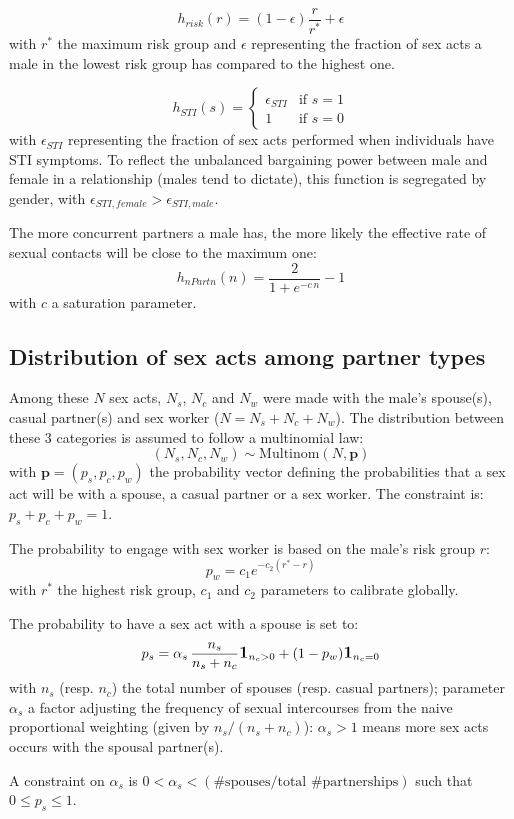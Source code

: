 \documentclass[11pt, onecolumn]{article}
\newcommand{\one}[1]{\textbf{\large{1}}_{#1}}
\begin{document}
$$h_{risk}(r) = (1-\epsilon)\frac{r}{r^*} + \epsilon $$
with $r^*$ the maximum risk group and $\epsilon$ representing the fraction of sex acts a male in the lowest risk group has compared to the highest one.

$$h_{STI}(s) = 
\begin{cases}
\epsilon_{STI} & \text{if } s=1\\
1 & \text{if } s=0
\end{cases}$$
with $\epsilon_{STI}$ representing the fraction of sex acts performed when individuals have STI symptoms. 
To reflect the unbalanced bargaining power between male and female in a relationship (males tend to dictate), this function is segregated by gender, with $\epsilon_{STI,female}>\epsilon_{STI,male}$. 

The more concurrent partners a male has, the more likely the effective rate of sexual contacts will be close to the maximum one:
$$h_{nPartn}(n) = \frac{2}{1+e^{-c\, n}} -1 $$
with $c$ a saturation parameter.

\subsection{Distribution of sex acts among partner types}

Among these $N$ sex acts, $N_s$, $N_c$ and $N_w$ were made with the male's spouse(s), casual partner(s) and sex worker ($N=N_s+N_c+N_w$). The distribution between these 3 categories is assumed to follow a multinomial law: 
$$(N_s,N_c,N_w) \sim \mathrm{Multinom}(N,\mathbf{p}) $$
with $\mathbf{p}=(p_s,p_c,p_w)$ the probability vector defining the probabilities that a sex act will be with a spouse, a casual partner or a sex worker. The constraint is: $p_s+p_c+p_w=1$.

The probability to engage with sex worker is based on the male's risk group $r$:
$$ p_w = c_1 e^{-c_2(r^*-r)}$$
with $r^*$ the highest risk group, $c_1$ and $c_2$ parameters to calibrate globally. 

The probability to have a sex act with a spouse is set to:
$$p_s = \alpha_s \,\frac{n_s}{n_s+n_c} \one{n_c>0} + (1-p_w)\one{n_c=0}$$
with $n_s$ (resp. $n_c$) the total number of spouses (resp. casual partners); parameter $\alpha_s$ a factor adjusting the frequency of sexual intercourses from the naive proportional weighting (given by $n_s/(n_s+n_c)$): $\alpha_s>1$ means more sex acts occurs with the spousal partner(s). 


A constraint on $\alpha_s$ is $0<\alpha_s<(\text{\# spouses} / \text{total \# partnerships})$ such that $0\leq p_s \leq 1$. 
\end{document}
